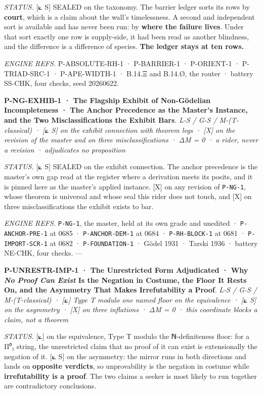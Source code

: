 \documentclass[10pt,twocolumn]{article}
\begin{document}
\emph{STATUS.} {[}⟀ S{]} SEALED on the taxonomy. The barrier ledger
sorts its rows by \textbf{court}, which is a claim about the wall's
timelessness. A second and independent sort is available and has never
been run: by \textbf{where the failure lives}. Under that sort exactly
one row is supply-side, it had been read as another blindness, and the
difference is a difference of species. \textbf{The ledger stays at ten
rows.}

\emph{ENGINE REFS.} P-ABSOLUTE-RH-1 · P-BARRIER-1 · P-ORIENT-1 ·
P-TRIAD-SRC-1 · P-APE-WIDTH-1 · B.14.Ξ and B.14.Ø, the router · battery
SS-CHK, four checks, seed 20260622.

\textbf{P-NG-EXHIB-1 · The Flagship Exhibit of Non-Gödelian
Incompleteness · The Anchor Precedence as the Master's Instance, and the
Two Misclassifications the Exhibit Bars}. \emph{L-S / G-S /
M-(T-classical) · {[}⟀ S{]} on the exhibit connection with theorem legs
· {[}X{]} on the revision of the master and on three misclassifications
· ΔM = 0 · a rider, never a revision · adjudicates no proposition}

\emph{STATUS.} {[}⟀ S{]} SEALED on the exhibit connection. The anchor
precedence is the master's own gap read at the register where a
derivation meets its posits, and it is pinned here as the master's
applied instance. {[}X{]} on any revision of \texttt{P-NG-1}, whose
theorem is universal and whose seal this rider does not touch, and
{[}X{]} on three misclassifications the exhibit exists to bar.

\emph{ENGINE REFS.} \texttt{P-NG-1}, the master, held at its own grade
and unedited · \texttt{P-ANCHOR-PRE-1} at 0685 · \texttt{P-ANCHOR-DEM-1}
at 0684 · \texttt{P-RH-BLOCK-1} at 0681 · \texttt{P-IMPORT-SCR-1} at
0682 · \texttt{P-FOUNDATION-1} · Gödel 1931 · Tarski 1936 · battery
NE-CHK, four checks. ---

\textbf{P-UNRESTR-IMP-1 · The Unrestricted Form Adjudicated · Why
\emph{No Proof Can Exist} Is the Negation in Costume, the Floor It Rests
On, and the Asymmetry That Makes Irrefutability a Proof}. \emph{L-S /
G-S / M-(T-classical) · {[}⟀{]} Type T modulo one named floor on the
equivalence · {[}⟀ S{]} on the asymmetry · {[}X{]} on three inflations ·
ΔM = 0 · this coordinate blocks a claim, not a theorem}

\emph{STATUS.} {[}⟀{]} on the equivalence, Type T modulo the
ℕ-definiteness floor: for a Π⁰₁ string, the unrestricted claim that no
proof of it can exist is extensionally the negation of it. {[}⟀ S{]} on
the asymmetry: the mirror runs in both directions and lands on
\textbf{opposite verdicts}, so unprovability is the negation in costume
while \textbf{irrefutability is a proof}. The two claims a seeker is
most likely to run together are contradictory conclusions.
\end{document}
